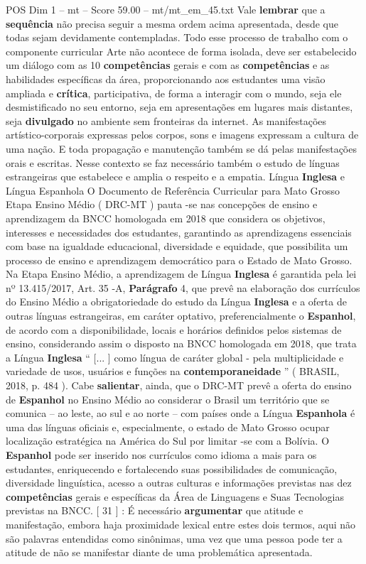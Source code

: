 \begin{textsample}{POS Dim 1 – mt – Score 59.00 – mt/mt\_em\_45.txt}
Vale \textbf{lembrar} que a \textbf{sequência} não precisa seguir a mesma ordem acima apresentada, desde que todas sejam devidamente contempladas.
Todo esse processo de trabalho com o componente curricular Arte não acontece de forma isolada, deve ser estabelecido um diálogo com as 10 \textbf{competências} gerais e com as \textbf{competências} e as habilidades específicas da área, proporcionando aos estudantes uma visão ampliada e \textbf{crítica}, participativa, de forma a interagir com o mundo, seja ele desmistificado no seu entorno, seja em apresentações em lugares mais distantes, seja \textbf{divulgado} no ambiente sem fronteiras da internet.
As manifestações artístico-corporais expressas pelos corpos, sons e imagens expressam a cultura de uma nação.
E toda propagação e manutenção também se dá pelas manifestações orais e escritas.
Nesse contexto se faz necessário também o estudo de línguas estrangeiras que estabelece e amplia o respeito e a empatia.
Língua \textbf{Inglesa} e Língua Espanhola O Documento de Referência Curricular para Mato Grosso Etapa Ensino Médio ( DRC-MT ) pauta -se nas concepções de ensino e aprendizagem da BNCC homologada em 2018 que considera os objetivos, interesses e necessidades dos estudantes, garantindo as aprendizagens essenciais com base na igualdade educacional, diversidade e equidade, que possibilita um processo de ensino e aprendizagem democrático para o Estado de Mato Grosso.
Na Etapa Ensino Médio, a aprendizagem de Língua \textbf{Inglesa} é garantida pela lei nº 13.415/2017, Art. 35 -A, \textbf{Parágrafo} 4, que prevê na elaboração dos currículos do Ensino Médio a obrigatoriedade do estudo da Língua \textbf{Inglesa} e a oferta de outras línguas estrangeiras, em caráter optativo, preferencialmente o \textbf{Espanhol}, de acordo com a disponibilidade, locais e horários definidos pelos sistemas de ensino, considerando assim o disposto na BNCC homologada em 2018, que trata a Língua \textbf{Inglesa} “ [... ] como língua de caráter global - pela multiplicidade e variedade de usos, usuários e funções na \textbf{contemporaneidade} ” ( BRASIL, 2018, p. 484 ).
Cabe \textbf{salientar}, ainda, que o DRC-MT prevê a oferta do ensino de \textbf{Espanhol} no Ensino Médio ao considerar o Brasil um território que se comunica – ao leste, ao sul e ao norte – com países onde a Língua \textbf{Espanhola} é uma das línguas oficiais e, especialmente, o estado de Mato Grosso ocupar localização estratégica na América do Sul por limitar -se com a Bolívia.
O \textbf{Espanhol} pode ser inserido nos currículos como idioma a mais para os estudantes, enriquecendo e fortalecendo suas possibilidades de comunicação, diversidade linguística, acesso a outras culturas e informações previstas nas dez \textbf{competências} gerais e específicas da Área de Linguagens e Suas Tecnologias previstas na BNCC. [ 31 ] : É necessário \textbf{argumentar} que atitude e manifestação, embora haja proximidade lexical entre estes dois termos, aqui não são palavras entendidas como sinônimas, uma vez que uma pessoa pode ter a atitude de não se manifestar diante de uma problemática apresentada.

\end{textsample}
